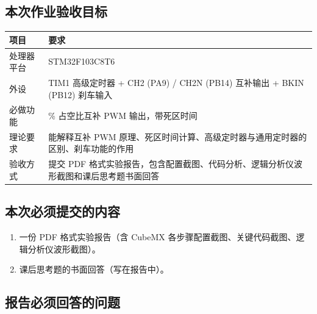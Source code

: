 \documentclass[
  chinese,
  UTF8,
  oneside,
  openany]{ctexbook}
\providecommand{\tightlist}{%
  \setlength{\itemsep}{0pt}\setlength{\parskip}{0pt}}
\begin{document}
\subsection{本次作业验收目标}\label{ux672cux6b21ux4f5cux4e1aux9a8cux6536ux76eeux6807-8}

\begin{longtable}[]{@{}
  >{\raggedright\arraybackslash}p{}
  >{\raggedright\arraybackslash}p{}@{}}
\toprule\noalign{}
\begin{minipage}[b]{\linewidth}\raggedright
项目
\end{minipage} & \begin{minipage}[b]{\linewidth}\raggedright
要求
\end{minipage} \\
\midrule\noalign{}
\endhead
\bottomrule\noalign{}
\endlastfoot
处理器平台 & STM32F103C8T6 \\
外设 & TIM1 高级定时器 + CH2 (PA9) / CH2N (PB14) 互补输出 + BKIN (PB12)
刹车输入 \\
必做功能 & 50\% 占空比互补 PWM 输出，带死区时间 \\
理论要求 & 能解释互补 PWM
原理、死区时间计算、高级定时器与通用定时器的区别、刹车功能的作用 \\
验收方式 & 提交 PDF
格式实验报告，包含配置截图、代码分析、逻辑分析仪波形截图和课后思考题书面回答 \\
\end{longtable}

\subsection{本次必须提交的内容}\label{ux672cux6b21ux5fc5ux987bux63d0ux4ea4ux7684ux5185ux5bb9-8}

\begin{enumerate}
\def\labelenumi{\arabic{enumi}.}
\tightlist
\item
  一份 PDF 格式实验报告（含 CubeMX
  各步骤配置截图、关键代码截图、逻辑分析仪波形截图）。
\item
  课后思考题的书面回答（写在报告中）。
\end{enumerate}

\subsection{报告必须回答的问题}\label{ux62a5ux544aux5fc5ux987bux56deux7b54ux7684ux95eeux9898-8}
\end{document}
